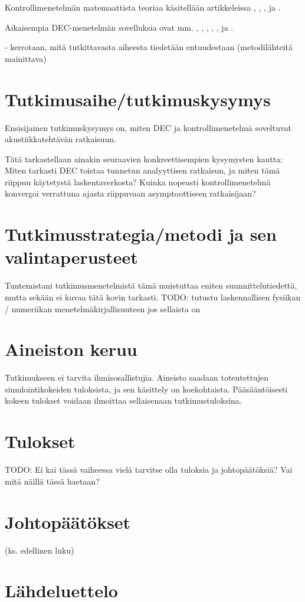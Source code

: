 \documentclass[utf8]{gradu3}
\begin{document}
Kontrollimenetelmän matemaattista teoriaa käsitellään artikkeleissa
\parencite{glowinski_ensuring_1992}, \parencite{lasiecka_exact_1989},
\parencite{lasiecka_exact_1989}, \parencite{lions_exact_1988}
ja \parencite{bristeau_controllability_1998}.

Aikaisempia DEC-menetelmän sovelluksia ovat mm.
\parencite{bossavit_discretization_2005}, \parencite{desbrun_discrete_2005},
\parencite{hirani_numerical_2015}, \parencite{vandekerckhove_mimetic_2014},
\parencite{nitschke_discrete_2017},
\parencite{rabina_numerical_2014} ja \parencite{monkola_discrete_2022}.

- kerrotaan, mitä tutkittavasta aiheesta tiedetään entuudestaan
(metodilähteitä mainittava)

\chapter{Tutkimusaihe/tutkimuskysymys}

Ensisijainen tutkimuskysymys on,
miten DEC ja kontrollimenetelmä soveltuvat akustiikkatehtävän ratkaisuun.

Tätä tarkastellaan ainakin seuraavien konkreettisempien kysymysten kautta:
Miten tarkasti DEC toistaa tunnetun analyyttisen ratkaisun,
ja miten tämä riippuu käytetystä laskentaverkosta?
Kuinka nopeasti kontrollimenetelmä konvergoi
verrattuna ajasta riippuvaan asymptoottiseen ratkaisijaan?

\chapter{Tutkimusstrategia/metodi ja sen valintaperusteet}

Tuntemistani tutkimusmenetelmistä tämä muistuttaa eniten suunnittelutiedettä,
mutta sekään ei kuvaa tätä kovin tarkasti.
TODO: tutustu laskennallisen fysiikan / numeriikan menetelmäkirjallisuuteen
jos sellaista on

\chapter{Aineiston keruu}

Tutkimukseen ei tarvita ihmisosallistujia.
Aineisto saadaan toteutettujen simulointikokeiden tuloksista,
ja sen käsittely on koekohtaista.
Pääsääntöisesti kokeen tulokset voidaan ilmoittaa sellaisenaan tutkimustuloksina.

\chapter{Tulokset}

TODO: Ei kai tässä vaiheessa vielä tarvitse olla tuloksia ja johtopäätöksiä?
Vai mitä näillä tässä haetaan?

\chapter{Johtopäätökset}

(ks. edellinen luku)

\chapter{Lähdeluettelo}

\printbibliography
\end{document}
